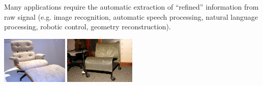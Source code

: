 \documentclass[c,8pt]{beamer}
\begin{document}
\def\dlcdecktitle{From neural networks to deep learning}
\def\dlclecturenumber{1}
\def\dlcdecknumber{1}


\openingframe




\begin{frame} %


Many applications require the automatic extraction of ``refined''
information from raw signal ({e.g.} image recognition, automatic
speech processing, natural language processing, robotic control,
geometry reconstruction).


\begin{center}
\includegraphics[height=2.25cm]{pics/imagenet-armchairs/armchairs/171272865_de284ebca6.jpg}
\hspace*{0pt}
\includegraphics[height=2.25cm]{pics/imagenet-armchairs/armchairs/2244045079_ce65f3f106.jpg}

\vspace*{-8pt}


\end{center}
\end{frame}
\end{document}
